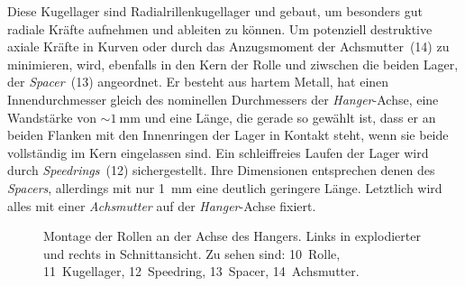 		Diese Kugellager sind Radialrillenkugellager und gebaut, um besonders gut radiale Kräfte aufnehmen und ableiten zu können.
		Um potenziell destruktive axiale Kräfte in Kurven oder durch das Anzugsmoment der Achsmutter~(14) zu minimieren, wird, ebenfalls in den Kern der Rolle und ziwschen die beiden Lager, der \textit{Spacer}~(13) angeordnet.
		Er besteht aus hartem Metall, hat einen Innendurchmesser gleich des nominellen Durchmessers der \textit{Hanger}-Achse, eine Wandstärke von \(\sim \qty{1}{\milli\metre}\) und eine Länge, die gerade so gewählt ist, dass er an beiden Flanken mit den Innenringen der Lager in Kontakt steht, wenn sie beide vollständig im Kern eingelassen sind.
		Ein schleiffreies Laufen der Lager wird durch \textit{Speedrings}~(12) sichergestellt.
		Ihre Dimensionen entsprechen denen des \textit{Spacers}, allerdings mit nur \qty{1}{\milli\metre} eine deutlich geringere Länge.
		Letztlich wird alles mit einer \textit{Achsmutter} auf der \textit{Hanger}-Achse fixiert.
		\begin{figure}[h]
			\centering
			
			\caption[Montage der Rollen an der Achse des Hanger]{Montage der Rollen an der Achse des Hangers. Links in explodierter und rechts in Schnittansicht. Zu sehen sind: 10~Rolle, 11~Kugellager, 12~Speedring, 13~Spacer, 14~Achsmutter.}
			\label{fig:wheel NT exploded}
		\end{figure}

